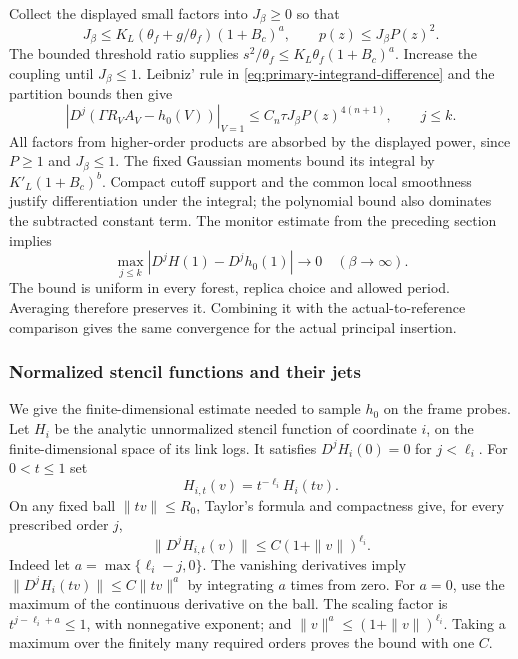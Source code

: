 Collect the displayed small factors into $J_\beta\ge0$ so that
\[
 J_\beta\le K_L(\theta_f+g/\theta_f)(1+B_c)^a,
 \qquad p(z)\le J_\beta P(z)^2.
\]
The bounded threshold ratio supplies $s^2/\theta_f\le
K_L\theta_f(1+B_c)^a$. Increase the coupling until $J_\beta\le1$.
Leibniz' rule in \eqref{eq:primary-integrand-difference} and the
partition bounds then give
\[
 |D^j(\Gamma R_V A_V-h_0(V))|_{V=1}
                \le C_n\tau J_\beta P(z)^{4(n+1)},
                         \qquad j\le k.
\]
All factors from higher-order products are absorbed by the displayed
power, since $P\ge1$ and $J_\beta\le1$. The fixed Gaussian moments
bound its integral by $K'_L(1+B_c)^b$. Compact cutoff support and the
common local smoothness justify differentiation under the integral;
the polynomial bound also dominates the subtracted constant term.
The monitor estimate from the preceding section implies
\begin{equation}\label{eq:primary-flat-gaussian}
 \max_{j\le k}|D^jH(1)-D^jh_0(1)|\longrightarrow0
                                      \quad(\beta\to\infty).
\end{equation}
The bound is uniform in every forest, replica choice and allowed
period. Averaging therefore preserves it. Combining it with the
actual-to-reference comparison gives the same convergence for the
actual principal insertion.

\subsubsection{Normalized stencil functions and their jets}
We give the finite-dimensional estimate needed to sample $h_0$ on the
frame probes. Let $H_i$ be the analytic unnormalized stencil function
of coordinate $i$, on the finite-dimensional space of its link logs.
It satisfies $D^jH_i(0)=0$ for $j<\ell_i$. For $0<t\le1$ set
\[
                       H_{i,t}(v)=t^{-\ell_i}H_i(tv).
\]
On any fixed ball $\|tv\|\le R_0$, Taylor's formula and compactness
give, for every prescribed order $j$,
\begin{equation}\label{eq:primary-normalized-jets}
                    \|D^jH_{i,t}(v)\|
                           \le C(1+\|v\|)^{\ell_i}.
\end{equation}
Indeed let $a=\max\{\ell_i-j,0\}$. The vanishing derivatives imply
$\|D^jH_i(tv)\|\le C\|tv\|^a$ by integrating $a$ times from zero.
For $a=0$, use the maximum of the continuous derivative on the ball.
The scaling factor is $t^{j-\ell_i+a}\le1$, with nonnegative exponent;
and $\|v\|^a\le(1+\|v\|)^{\ell_i}$. Taking a maximum over the
finitely many required orders proves the bound with one $C$.

